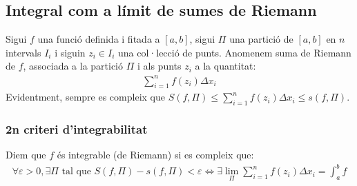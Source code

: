 \subsection{Integral com a límit de sumes de Riemann}
Sigui $f$ una funció definida i fitada a $[a , b]$, sigui $\Pi$ una partició de $[a , b]$ en $n$ intervals $I_{i}$ i siguin $z_{i} \in I_{i}$ una col·lecció de punts. Anomenem suma de Riemann de $f$, associada a la partició $\Pi$ i als punts $z_{i}$ a la quantitat:
\begin{align}
    \sum\limits_{i=1}^{n} f(z_{i}) \Delta x_{i}
\end{align}
Evidentment, sempre es compleix que $S(f , \Pi) \leq \sum\limits_{i=1}^{n} f(z_{i}) \Delta x_{i} \leq s(f , \Pi)$.
\subsubsection*{2n criteri d'integrabilitat}
Diem que $f$ és integrable (de Riemann) si es compleix que:
\begin{align}
    \forall \varepsilon > 0, \exists \Pi \text{ tal que } S(f , \Pi) - s(f , \Pi) < \varepsilon \Leftrightarrow \exists \lim_{\Pi} \sum\limits_{i=1}^{n} f(z_{i}) \Delta x_{i} = \int_{a}^{b} f
\end{align}

